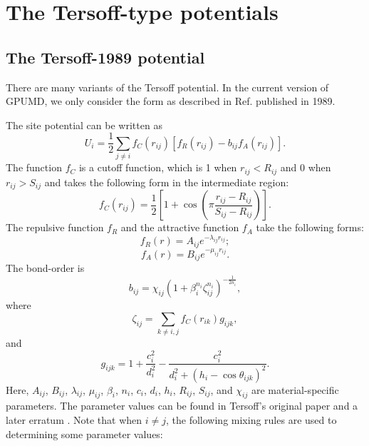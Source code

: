 \documentclass[12pt,a4paper]{report}
\begin{document}
\section{The Tersoff-type potentials}

\subsection{The Tersoff-1989 potential}

There are many variants of the Tersoff potential. In the current version of GPUMD, we only consider the form as described in Ref. \cite{tersoff1989prb} published in 1989.

The site potential can be written as
\begin{equation}
U_i =  \frac{1}{2} \sum_{j \neq i} f_C(r_{ij}) \left[ f_R(r_{ij}) - b_{ij} f_A(r_{ij}) \right].
\end{equation}
The function $f_{C}$ is a cutoff function, which is 1 when $r_{ij}<R_{ij}$ and 0 when  $r_{ij}>S_{ij}$ and takes the following form in the intermediate region:
\begin{equation}
f_{C}(r_{ij}) = \frac{1}{2}
\left[
1 + \cos \left( \pi \frac{r_{ij} - R_{ij}}{S_{ij} - R_{ij}} \right)
\right].
\end{equation}
The repulsive function $f_{R}$ and the attractive function $f_{A}$ take the following forms:
\begin{equation}
f_{R}(r) = A_{ij} e^{-\lambda_{ij} r_{ij}};
\end{equation}
\begin{equation}
f_{A}(r) = B_{ij} e^{-\mu_{ij} r_{ij}}.
\end{equation}
The bond-order is
\begin{equation}
\label{equation:bij}
b_{ij} = \chi_{ij} \left(1 + \beta_i^{n_i} \zeta^{n_i}_{ij}\right)^{-\frac{1}{2n_i}},
\end{equation}
where
\begin{equation}
\zeta_{ij} = \sum_{k\neq i, j}f_C(r_{ik}) g_{ijk},
\end{equation}
and
\begin{equation}
g_{ijk} = 1 + \frac{c_i^2}{d_i^2} - \frac{c_i^2}{d_i^2+(h_i-\cos\theta_{ijk})^2}.
\end{equation}
Here, $A_{ij}$, $B_{ij}$, $\lambda_{ij}$, $\mu_{ij}$, $\beta_i$, $n_i$, $c_i$, $d_i$, $h_i$, $R_{ij}$, $S_{ij}$, and $\chi_{ij}$ are material-specific parameters. The parameter values can be found in Tersoff's original paper \cite{tersoff1989prb} and a later erratum \cite{tersoff1990prb}. Note that when $i \neq j$, the following mixing rules are used to determining some parameter values:
\end{document}
